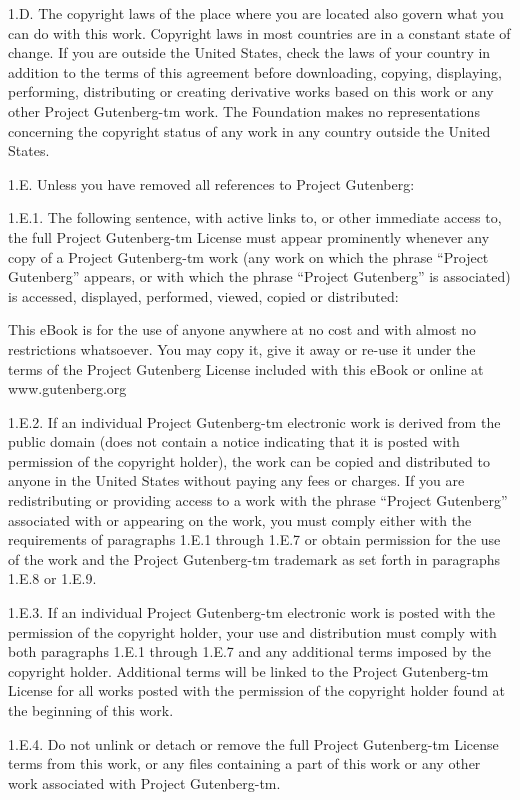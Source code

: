 1.D.  The copyright laws of the place where you are located also govern
what you can do with this work.  Copyright laws in most countries are in
a constant state of change.  If you are outside the United States, check
the laws of your country in addition to the terms of this agreement
before downloading, copying, displaying, performing, distributing or
creating derivative works based on this work or any other Project
Gutenberg-tm work.  The Foundation makes no representations concerning
the copyright status of any work in any country outside the United
States.

1.E.  Unless you have removed all references to Project Gutenberg:

1.E.1.  The following sentence, with active links to, or other immediate
access to, the full Project Gutenberg-tm License must appear prominently
whenever any copy of a Project Gutenberg-tm work (any work on which the
phrase “Project Gutenberg” appears, or with which the phrase “Project
Gutenberg” is associated) is accessed, displayed, performed, viewed,
copied or distributed:

This eBook is for the use of anyone anywhere at no cost and with
almost no restrictions whatsoever.  You may copy it, give it away or
re-use it under the terms of the Project Gutenberg License included
with this eBook or online at www.gutenberg.org

1.E.2.  If an individual Project Gutenberg-tm electronic work is derived
from the public domain (does not contain a notice indicating that it is
posted with permission of the copyright holder), the work can be copied
and distributed to anyone in the United States without paying any fees
or charges.  If you are redistributing or providing access to a work
with the phrase “Project Gutenberg” associated with or appearing on the
work, you must comply either with the requirements of paragraphs 1.E.1
through 1.E.7 or obtain permission for the use of the work and the
Project Gutenberg-tm trademark as set forth in paragraphs 1.E.8 or
1.E.9.

1.E.3.  If an individual Project Gutenberg-tm electronic work is posted
with the permission of the copyright holder, your use and distribution
must comply with both paragraphs 1.E.1 through 1.E.7 and any additional
terms imposed by the copyright holder.  Additional terms will be linked
to the Project Gutenberg-tm License for all works posted with the
permission of the copyright holder found at the beginning of this work.

1.E.4.  Do not unlink or detach or remove the full Project Gutenberg-tm
License terms from this work, or any files containing a part of this
work or any other work associated with Project Gutenberg-tm.

